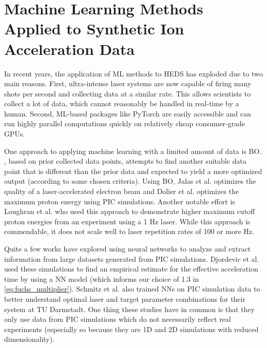 \chapter{Machine Learning Methods Applied to Synthetic Ion Acceleration Data} \label{ch:5}

In recent years, the application of \gls{ML} methods to \gls{HEDS} has exploded due to two main reasons. First, ultra-intense laser systems are now capable of firing many shots per second and collecting data at a similar rate. This allows scientists to collect a lot of data, which cannot reasonably be handled in real-time by a human. Second, \gls{ML}-based packages like PyTorch \cite{PyTorch_2019} are easily accessible and can run highly parallel computations quickly on relatively cheap consumer-grade \gls{GPU}s.

One approach to applying machine learning with a limited amount of data is \gls{BO}. , based on prior collected data points, attempts to find another suitable data point that is different than the prior data and expected to yield a more optimized output (according to some chosen criteria). Using \gls{BO}, Jalas et al. \cite{Jalas_2021_PRL} optimizes the quality of a laser-accelerated electron beam and Dolier et al. \cite{Dolier_2022_NJoP} optimizes the maximum proton energy using PIC simulations. Another notable effort is Loughran et al. \cite{Loughran_2023_HPLSE} who used this approach to demonstrate higher maximum cutoff proton energies from an experiment using a 1 Hz laser. While this approach is commendable, it does not scale well to laser repetition rates of 100 or more Hz. 

Quite a few works have explored using neural networks to analyze and extract information from large datasets generated from \gls{PIC} simulations. Djordevic et al. \cite{Djordjevic_2021_PPCF} used these simulations to find an empirical estimate for the effective acceleration time by using a \gls{NN} model (which informs our choice of 1.3 in \autoref{eq:fuchs_multiplier}). Schmitz et al. \cite{Schmitz_2023_LaPB} also trained \gls{NN}s on \gls{PIC} simulation data to better understand optimal laser and target parameter combinations for their system at TU Darmstadt. One thing these studies have in common is that they only use data from \gls{PIC} simulations which do not necessarily reflect real experiments (especially so because they are 1D and 2D simulations with reduced dimensionality). 

